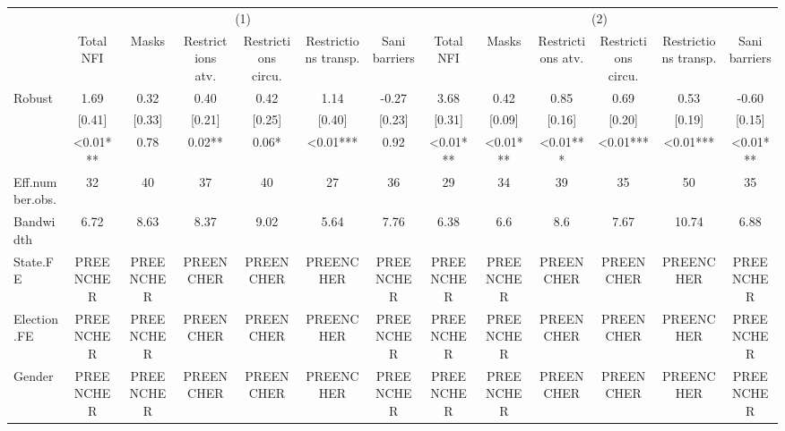 \captionsetup[table]{labelformat=empty,skip=1pt}
\begin{longtable}{lcccccccccccc}
\toprule
 & \multicolumn{6}{c}{(1)} & \multicolumn{6}{c}{(2)} \\ 
\cmidrule(lr){2-7} \cmidrule(lr){8-13}
  & Total NFI & Masks & Restrictions atv. & Restrictions circu. & Restrictions transp. & Sani barriers & Total NFI  & Masks  & Restrictions atv.  & Restrictions circu.  & Restrictions transp.  & Sani barriers  \\ 
\midrule
Robust & 1.69 & 0.32 & 0.40 & 0.42 & 1.14 & -0.27 & 3.68 & 0.42 & 0.85 & 0.69 & 0.53 & -0.60 \\ 
 & [0.41] & [0.33] & [0.21] & [0.25] & [0.40] & [0.23] & [0.31] & [0.09] & [0.16] & [0.20] & [0.19] & [0.15] \\ 
 & <0.01*** & 0.78 & 0.02** & 0.06* & <0.01*** & 0.92 & <0.01*** & <0.01*** & <0.01*** & <0.01*** & <0.01*** & <0.01*** \\ 
Eff.number.obs. & 32 & 40 & 37 & 40 & 27 & 36 & 29 & 34 & 39 & 35 & 50 & 35 \\ 
Bandwidth & 6.72 & 8.63 & 8.37 & 9.02 & 5.64 & 7.76 & 6.38 & 6.6 & 8.6 & 7.67 & 10.74 & 6.88 \\ 
State.FE & PREENCHER & PREENCHER & PREENCHER & PREENCHER & PREENCHER & PREENCHER & PREENCHER & PREENCHER & PREENCHER & PREENCHER & PREENCHER & PREENCHER \\ 
Election.FE & PREENCHER & PREENCHER & PREENCHER & PREENCHER & PREENCHER & PREENCHER & PREENCHER & PREENCHER & PREENCHER & PREENCHER & PREENCHER & PREENCHER \\ 
Gender & PREENCHER & PREENCHER & PREENCHER & PREENCHER & PREENCHER & PREENCHER & PREENCHER & PREENCHER & PREENCHER & PREENCHER & PREENCHER & PREENCHER \\ 
\bottomrule
\end{longtable}

